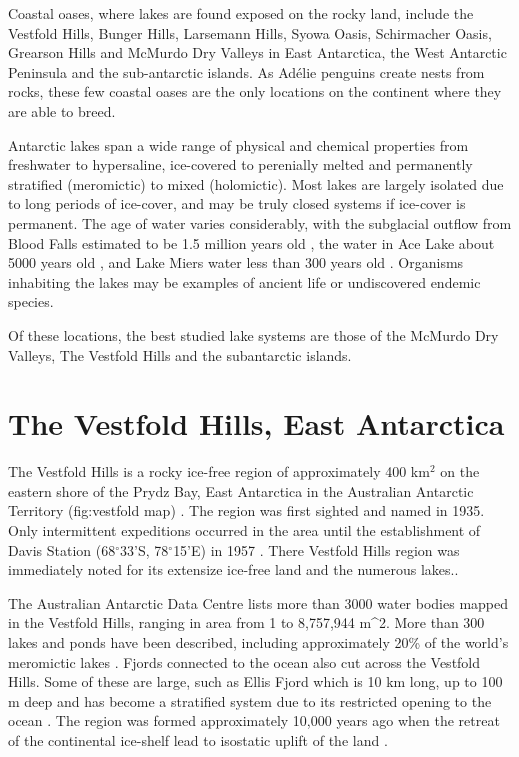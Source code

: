 Coastal oases, where lakes are found exposed on the rocky land, include the Vestfold Hills, Bunger Hills, Larsemann Hills, Syowa Oasis, Schirmacher Oasis, Grearson Hills and McMurdo Dry Valleys
 in East Antarctica, the West Antarctic Peninsula and the sub-antarctic islands.
As Ad\'{e}lie penguins create nests from rocks, these few coastal oases are the only locations on the continent where they are able to breed.

Antarctic lakes span a wide range of physical and chemical properties from freshwater to hypersaline, ice-covered to perenially melted and permanently stratified (meromictic) to mixed (holomictic).
Most lakes are largely isolated due to long periods of ice-cover, and may be truly closed systems if ice-cover is permanent.
The age of water varies considerably, with the subglacial outflow from Blood Falls estimated to be 1.5 million years old \cite{Mickucki2009}, the water in Ace Lake about 5000 years old
 \cite{Rankin1999}, and Lake Miers water less than 300 years old \cite{Green1988}. %
Organisms inhabiting the lakes may be examples of ancient life or undiscovered endemic species.

Of these locations, the best studied lake systems are those of the McMurdo Dry Valleys, The Vestfold Hills and the subantarctic islands.


\section[Vestfold Hills]{The Vestfold Hills, East Antarctica}

The Vestfold Hills is a rocky ice-free region of approximately 400 km$^2$ on the eastern shore of the Prydz Bay, East Antarctica in the Australian Antarctic Territory (fig:vestfold map) \cite{Gibson1999}.
The region was first sighted and named in 1935\cite{Law1959}.
Only intermittent expeditions occurred in the area until the establishment of Davis Station (68$^{\circ}$33'S, 78$^{\circ}$15'E) in 1957 \cite {Law1959}. 
There Vestfold Hills region was immediately noted for its extensize ice-free land and the numerous lakes.\cite{Johnstone1973}.

The Australian Antarctic Data Centre lists more than 3000 water bodies mapped in the Vestfold Hills, ranging in area from 1 to 8,757,944 m\^{}2.%
More than 300 lakes and ponds have been described, including approximately 20\% of the world's meromictic lakes \cite{Gibson, 1999}. %
Fjords connected to the ocean also cut across the Vestfold Hills. 
Some of these are large, such as Ellis Fjord which is 10 km long, up to 100 m deep and has become a stratified system due to its restricted opening to the ocean \cite{Burke1988}.
The region was formed approximately 10,000 years ago when the retreat of the continental ice-shelf lead to isostatic uplift of the land \cite{Burton1981}. 

